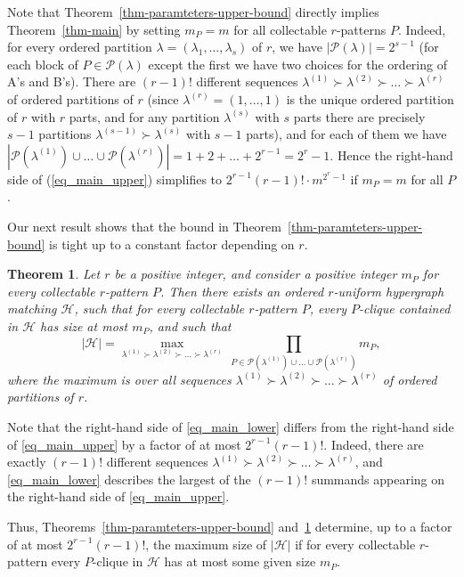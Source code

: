 \documentclass{aic}
\newtheorem{theorem}{Theorem}[section]
\theoremstyle{definition}
\numberwithin{equation}{section}
\numberwithin{figure}{section}
\newcommand{\HH}{\mathcal{H}}
\newcommand{\PP}{\mathcal{P}}
\begin{document}
Note that Theorem~\ref{thm-paramteters-upper-bound} directly implies Theorem~\ref{thm-main} by setting $m_P=m$ for all collectable $r$-patterns $P$. Indeed, for every ordered partition $\lambda=(\lambda_1,\dots,\lambda_s)$ of $r$, we have $|\PP(\lambda)|=2^{s-1}$ (for each block of $P \in \PP(\lambda)$ except the first we have two choices for the ordering of A's and B's). There are $(r-1)!$ different sequences $\lambda^{(1)} \succ \lambda^{(2)} \succ \dots \succ \lambda^{(r)}$ of ordered partitions of $r$ (since $\lambda^{(r)}=(1,\dots,1)$ is the unique ordered partition of $r$ with $r$ parts, and for any partition $\lambda^{(s)}$ with $s$ parts there are precisely $s-1$ partitions $\lambda^{(s-1)} \succ \lambda^{(s)}$ with $s-1$ parts), and for each of them we have $|\PP(\lambda^{(1)})\cup\dots\cup \PP(\lambda^{(r)})|=1+2+\dots+2^{r-1}=2^r-1$. Hence the right-hand side of (\ref{eq_main_upper}) simplifies to $2^{r-1}(r-1)!\cdot m^{2^r-1}$ if $m_P=m$ for all $P$.

Our next result shows that the bound in Theorem~\ref{thm-paramteters-upper-bound} is tight up to a constant factor depending on $r$.

\begin{theorem} \label{thm-paramteters-lower-bound}
Let $r$ be a positive integer, and consider a positive integer $m_P$ for every collectable $r$-pattern $P$. Then there exists an  ordered $r$-uniform hypergraph matching $\HH$, such that for every collectable $r$-pattern $P$, every $P$-clique contained in $\HH$ has size at most $m_P$, and such that
\begin{equation}\label{eq_main_lower}
|\HH|= \max_{\lambda^{(1)} \succ \lambda^{(2)} \succ \dots \succ \lambda^{(r)}}\ \prod_{P\in \PP(\lambda^{(1)})\cup\dots\cup \PP(\lambda^{(r)})} m_{P},
\end{equation}
where the maximum is over all sequences $\lambda^{(1)} \succ \lambda^{(2)} \succ \dots \succ \lambda^{(r)}$ of ordered partitions of $r$.
\end{theorem}

Note that the right-hand side of \eqref{eq_main_lower} differs from the right-hand side of \eqref{eq_main_upper} by a factor of at most $2^{r-1}(r-1)!$. Indeed, there are exactly $(r-1)!$ different sequences $\lambda^{(1)} \succ \lambda^{(2)} \succ \dots \succ \lambda^{(r)}$, and \eqref{eq_main_lower} describes the largest of the $(r-1)!$ summands appearing on the right-hand side of \eqref{eq_main_upper}.

Thus, Theorems~\ref{thm-paramteters-upper-bound} and~\ref{thm-paramteters-lower-bound} determine, up to a factor of at most $2^{r-1}(r-1)!$, the maximum size of $|\HH|$ if for every collectable $r$-pattern every $P$-clique in $\HH$ has at most some given size $m_P$.
\end{document}

